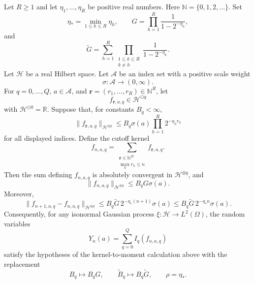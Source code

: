 \begin{theorem}
\label{thm:spde-multiscale-sector-kernel-summability}
Let \(R\geq1\) and let \(\eta_1,\ldots,\eta_R\) be positive real numbers.
Here \(\mathbb N=\{0,1,2,\ldots\}\).
Set
\[
  \eta_*=\min_{1\leq h\leq R}\eta_h,\qquad
  G=\prod_{h=1}^R\frac{1}{1-2^{-\eta_h}},
\]
and
\[
  \widetilde G
  =
  \sum_{h=1}^R
  \prod_{\substack{1\leq k\leq R\\ k\neq h}}
  \frac{1}{1-2^{-\eta_k}} .
\]
Let \(\mathcal H\) be a real Hilbert space.  Let \(\mathcal A\) be an index
set with a positive scale weight
\[
  \sigma:\mathcal A\to(0,\infty).
\]
For \(q=0,\ldots,Q\), \(a\in\mathcal A\), and
\(\mathbf r=(r_1,\ldots,r_R)\in\mathbb N^R\), let
\[
  f_{\mathbf r,a,q}\in \mathcal H^{\odot q}
\]
with \(\mathcal H^{\odot0}=\mathbb R\).  Suppose that, for constants
\(B_q<\infty\),
\begin{equation}
  \|f_{\mathbf r,a,q}\|_{\mathcal H^{\otimes q}}
  \leq
  B_q\sigma(a)\prod_{h=1}^R2^{-\eta_h r_h}
  \label{eq:spde-sector-kernel-gap-bound}
\end{equation}
for all displayed indices.  Define the cutoff kernel
\[
  f_{n,a,q}
  =
  \sum_{\substack{\mathbf r\in\mathbb N^R\\
                  \max_h r_h\leq n}}
  f_{\mathbf r,a,q}.
\]
Then the sum defining \(f_{n,a,q}\) is absolutely convergent in
\(\mathcal H^{\otimes q}\), and
\begin{equation}
  \|f_{n,a,q}\|_{\mathcal H^{\otimes q}}
  \leq
  B_qG\sigma(a).
  \label{eq:spde-sector-uniform-kernel-bound}
\end{equation}
Moreover,
\begin{equation}
  \|f_{n+1,a,q}-f_{n,a,q}\|_{\mathcal H^{\otimes q}}
  \leq
  B_q\widetilde G\,2^{-\eta_*(n+1)}\sigma(a)
  \leq
  B_q\widetilde G\,2^{-\eta_*n}\sigma(a).
  \label{eq:spde-sector-kernel-increment-bound}
\end{equation}
Consequently, for any isonormal Gaussian process
\(\xi:\mathcal H\to L^2(\Omega)\), the random variables
\[
  Y_n(a)=\sum_{q=0}^Q I_q(f_{n,a,q})
\]
satisfy the hypotheses of
the kernel-to-moment calculation above with the replacement
\[
  B_q\mapsto B_qG,\qquad
  \widetilde B_q\mapsto B_q\widetilde G,\qquad
  \rho=\eta_* .
\]
\end{theorem}

